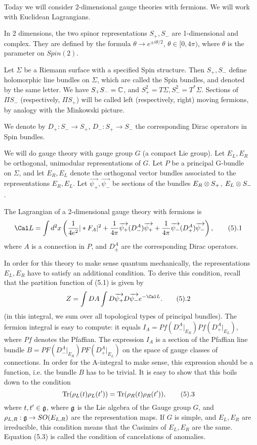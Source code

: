 Today we will consider 2-dimensional gauge theories with fermions. 
We will work with Euclidean Lagrangians. 

In 2 dimensions, the two spinor representations $S_+,S_-$ are 1-dimensional
and complex. They are 
defined by the formula $\theta\to e^{\pm i\theta/2}$, $\theta\in 
[0,4\pi)$, where $\theta$ is the parameter on $Spin(2)$.  

Let $\Sigma$ be a Riemann surface with a specified Spin structure.
Then $S_+,S_-$ define holomorphic line bundles on $\Sigma$, which
are called the Spin bundles, and denoted by the same letter. 
We have $S_+S_-=\Bbb C$, and $S_+^2=T\Sigma,S_-^2=T^*\Sigma$. 
Sections of $\Pi S_-$ (respectively, $\Pi S_+$) will be called left 
(respectively, right) moving fermions, by analogy with the 
Minkowski picture.
  
We denote by $D_+:S_-\to S_+$, $D_-: S_+\to S_-$ the corresponding 
Dirac operators in Spin bundles. 

We will do gauge theory with gauge group $G$ (a compact Lie group).
Let $E_L,E_R$ be orthogonal, unimodular representations of $G$. 
Let $P$  be a principal G-bundle on $\Sigma$, and let $E_R,E_L$ 
denote the orthogonal vector bundles associated to 
the representations $E_R,E_L$.  
Let $\overrightarrow{\psi_+},\overrightarrow{\psi_-}$ 
be sections of the bundles $E_R\otimes S_+$, $E_L\otimes S_-$. 

The Lagrangian of a 2-dimensional gauge theory with fermions is
$$
\Cal L=\int d^2x\left(\frac{1}{4e^2}|*F_A|^2+\frac{1}{4\pi}
\overrightarrow{\psi_+}(D_-^A)\overrightarrow{\psi_+}
+\frac{1}{4\pi }\overrightarrow{\psi_-}(D_+^A)
\overrightarrow{\psi_-}\right),\tag 5.1
$$
where $A$ is a connection in $P$, and $D_\pm^A$ are the corresponding 
Dirac operators.

In order for this theory to make sense quantum mechanically, the 
representations $E_L,E_R$ have to satisfy an additional condition.
To derive this condition, recall that the partition function of
(5.1) is given by 
$$
Z=\int DA\int D\overrightarrow{\psi_+}D\overrightarrow{\psi_-}e^{-\Cal L}.\tag 5.2
$$ 
(in this integral, we sum over all topological types of principal bundles).
The fermion integral is easy to compute: it equals
$I_A=Pf(D_-^A|_{E_R})Pf(D_+^A|_{E_L})$, where $Pf$ denotes the Pfaffian. 
The expression $I_A$ is a section of the Pfaffian line bundle
$B=PF(D_-^A|_{E_R})PF(D_+^A|_{E_L})$ on the space of 
gauge classes of connections. 
In order for the A-integral to make sense, this expression 
should be a function, i.e. the bundle $B$ has to be trivial.
It is easy to show that this boils down to the condition
$$
\Tr(\rho_L(t)\rho_L(t'))=\Tr(\rho_R(t)\rho_R(t')),\tag 5.3
$$
where $t,t'\in \frak g$, where
$\frak g$ is the Lie algebra of the Gauge group $G$, 
and $\rho_{L,R}: \frak g\to SO(E_{L,R})$
are the representation maps. If $G$ is simple, and $E_L,E_R$ are irreducible, 
this condition means that the Casimirs of $E_L,E_R$ are the same.
Equation (5.3) is called the condition of cancelations of anomalies. 

